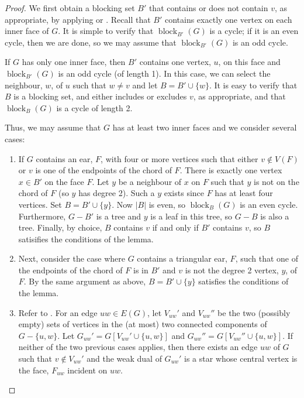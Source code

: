 \documentclass{patmorin}
\DeclareMathOperator{\block}{block}
\begin{document}
\begin{proof}
  We first obtain a blocking set $B'$ that contains or does not
  contain $v$, as appropriate, by applying  or
  . Recall that $B'$ contains exactly one vertex
  on each inner face of $G$.  It is simple to verify that $\block_{B'}(G)$
  is a cycle;  if it is an even cycle, then we are done, so we may assume
  that $\block_{B'}(G)$ is an odd cycle.

  If $G$ has only one inner face, then $B'$ contains one vertex,
  $u$, on this face and $\block_{B'}(G)$ is an odd cycle (of length 1).
  In this case, we can select the neighbour, $w$, of $u$ such that
  $w\neq v$ and let $B=B'\cup\{w\}$.  It is easy to verify that $B$ is
  a blocking set, and either includes or excludes $v$, as appropriate,
  and that $\block_B(G)$ is a cycle of length 2.

  Thus, we may assume that $G$ has at least two inner faces and we
  consider several cases:
 
  \begin{enumerate}
  \item If $G$ contains an ear, $F$, with four or more vertices such that
  either $v\not\in V(F)$ or $v$ is one of the endpoints of the chord of
  $F$. There is exactly one vertex $x\in B'$ on the face $F$.  Let $y$
  be a neighbour of $x$ on $F$ such that $y$ is not on the chord of $F$
  (so $y$ has degree 2). Such a $y$ exists since $F$ has at least four
  vertices.  Set $B=B'\cup \{y\}$.  Now $|B|$ is even, so $\block_B(G)$
  is an even cycle.  Furthermore, $G-B'$ is a tree and $y$ is a leaf in
  this tree, so $G-B$ is also a tree.  Finally, by choice, $B$ contains
  $v$ if and only if $B'$ contains $v$, so $B$ satisifies the conditions
  of the lemma.

  \item Next, consider the case where $G$ contains a triangular ear, $F$,
  such that one of the endpoints of the chord of $F$ is in $B'$ and $v$
  is not the degree 2 vertex, $y$, of $F$.  By the same argument as above,
  $B=B'\cup\{y\}$ satisfies the conditions of the lemma.

  \item Refer to .  For an edge $uw\in E(G)$, let
  $V_{uw}'$ and $V_{uw}''$ be the two (possibly empty) sets of vertices
  in the (at most) two connected components of $G-\{u,w\}$.  Let
  $G_{uw}'=G[V_{uw}'\cup\{u,w\}]$ and $G_{uw}''=G[V_{uw}''\cup\{u,w\}]$.
  If neither of the two previous  cases applies, then there exists an
  edge $uw$ of $G$ such that $v\not\in V_{uw}'$ and the weak dual of
  $G_{uw}'$ is a star whose central vertex is the face, $F_{uw}$ incident
  on $uw$.  


\end{enumerate}
\end{proof}
\end{document}
